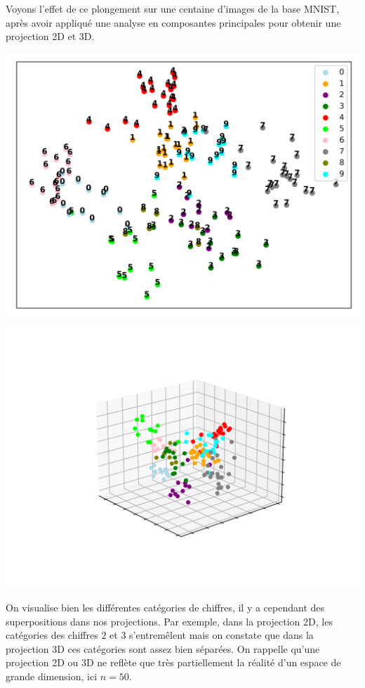 \documentclass[11pt,class=report,crop=false]{standalone}
\begin{document}
Voyons l'effet de ce plongement sur une centaine d'images de la base MNIST, après avoir appliqué une analyse en composantes principales pour obtenir une projection 2D et 3D.
\begin{center}
	\includegraphics[scale=\myscale,scale=0.5]{figures/mnist-embed-1}
	\includegraphics[scale=\myscale,scale=0.7,trim={2cm 2cm 2cm 2cm},clip]{figures/mnist-embed-2}
\end{center}

On visualise bien les différentes catégories de chiffres, il y a cependant des superpositions dans nos projections. Par exemple, dans la projection 2D, les catégories des chiffres $2$ et $3$ s’entremêlent mais on constate que dans la projection 3D ces catégories sont assez bien séparées. On rappelle qu'une projection 2D ou 3D ne reflète que très partiellement la réalité d'un espace de grande dimension, ici $n=50$. 
\end{document}
